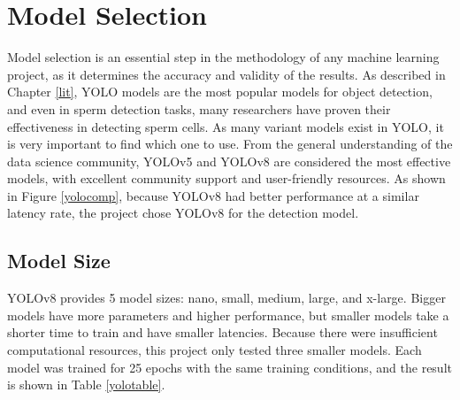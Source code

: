 \newpage
\section{Model Selection}
Model selection is an essential step in the methodology of any machine learning project, as it determines the accuracy and validity of the results. As described in Chapter \ref{lit}, YOLO models are the most popular models for object detection, and even in sperm detection tasks, many researchers have proven their effectiveness in detecting sperm cells. As many variant models exist in YOLO, it is very important to find which one to use. From the general understanding of the data science community, YOLOv5 and YOLOv8 are considered the most effective models, with excellent community support and user-friendly resources. As shown in Figure \ref{yolocomp}, because YOLOv8 had better performance at a similar latency rate, the project chose YOLOv8 for the detection model.

\subsection{Model Size}
YOLOv8 provides 5 model sizes: nano, small, medium, large, and x-large. Bigger models have more parameters and higher performance, but smaller models take a shorter time to train and have smaller latencies. Because there were insufficient computational resources, this project only tested three smaller models. Each model was trained for 25 epochs with the same training conditions, and the result is shown in Table \ref{yolotable}.


